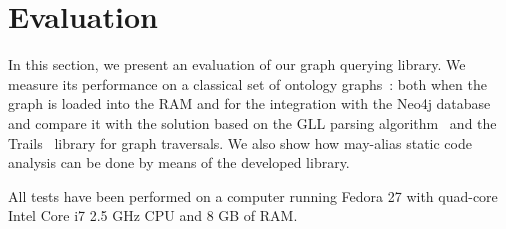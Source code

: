 \section{Evaluation}
\label{sec:evaluation}

In this section, we present an evaluation of our graph querying library.
We measure its performance on a classical set of ontology graphs~\cite{CFGonRDF}: both when the graph is loaded into the RAM and for the integration with the Neo4j database and compare it with the solution based on the GLL parsing algorithm~\cite{GrigorevR16} and the Trails~\cite{ScalaGraphParsing} library for graph traversals. We also show how may-alias static code analysis can be done by means of the developed library. 

All tests have been performed on a computer running Fedora 27 with quad-core Intel Core i7 2.5 GHz CPU and 8 GB of RAM.


